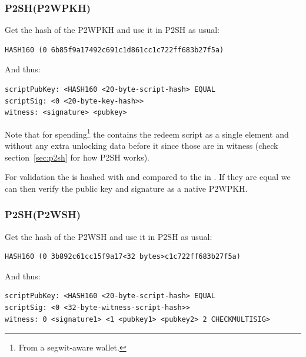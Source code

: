 \subsubsection*{P2SH(P2WPKH)}
Get the hash of the P2WPKH  and use it in P2SH as usual:

\begin{emphbox}
\begin{lstlisting}[style=Pseudomath]
HASH160 (0 6b85f9a17492c691c1d861cc1c722ff683b27f5a)
\end{lstlisting}
\end{emphbox}

And thus:

\begin{emphbox}
\begin{lstlisting}[style=Pseudomath]
scriptPubKey: <HASH160 <20-byte-script-hash> EQUAL
scriptSig: <0 <20-byte-key-hash>>
witness: <signature> <pubkey>
\end{lstlisting}
\end{emphbox}

Note that for spending\footnote{From a segwit-aware wallet.} the  contains the redeem script as a single element and without any extra unlocking data before it since those are in witness (check section~\ref{sec:p2sh} for how P2SH works). 

For validation the  is hashed with  and compared to the  in . If they are equal we can then verify the public key and signature as a native P2WPKH.


\subsubsection*{P2SH(P2WSH)}
Get the hash of the P2WSH  and use it in P2SH as usual:

\begin{emphbox}
\begin{lstlisting}[style=Pseudomath]
HASH160 (0 3b892c61cc15f9a17<32 bytes>c1c722ff683b27f5a)
\end{lstlisting}
\end{emphbox}

And thus:

\begin{emphbox}
\begin{lstlisting}[style=Pseudomath]
scriptPubKey: <HASH160 <20-byte-script-hash> EQUAL
scriptSig: <0 <32-byte-witness-script-hash>>
witness: 0 <signature1> <1 <pubkey1> <pubkey2> 2 CHECKMULTISIG>
\end{lstlisting}
\end{emphbox}

